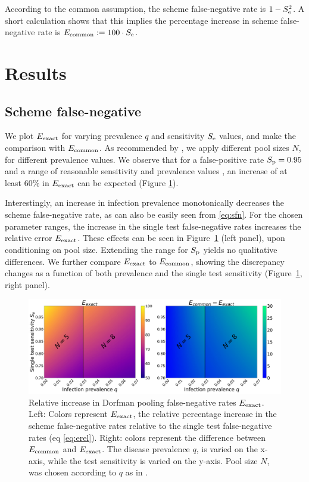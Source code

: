 \documentclass{article}
\begin{document}
According to the common assumption, the scheme false-negative rate is
$1-S_\text{e}^2$. A short calculation shows that this implies the percentage
increase in scheme false-negative rate is $E_{\text{{common}}} := 100\cdot
S_\text{e}$.

\section*{Results}\label{section:results}
\subsection*{Scheme false-negative}
We plot $E_{\text{{exact}}}$ for varying prevalence $q$ and sensitivity $S_\text{e}$
values, and make the comparison with $E_{\text{{common}}}$. As recommended by
\cite{DorfmanYuvalDor}, we apply different pool sizes $N$, for
different prevalence values. We observe that for a false-positive rate
$S_\text{p}=0.95$ \cite{DorfmanYuvalDor} and a range of reasonable
sensitivity and prevalence values \cite{KitComparison,
  InterpretingCOVID19Test, EstimatingRatesLourenco,
  FalsePositiveEstimate}, an increase of at least $60\%$ in
$E_{\text{{exact}}}$ can be expected (Figure \ref{fig1}).

Interestingly, an increase in infection prevalence monotonically
decreases the scheme false-negative rate, as can also be easily seen
from \eqref{eq:sfn}. For the chosen parameter ranges, the increase in
the single test false-negative rates increases the relative error
$E_{\text{{exact}}}$. These effects can be seen in Figure~\ref{fig1} (left
panel), upon conditioning on pool size. Extending the range for $S_\text{p}$
yields no qualitative differences. We further compare $E_{\text{{exact}}}$ to
$E_{\text{{common}}}$, showing the discrepancy changes as a function of both
prevalence and the single test sensitivity (Figure~\ref{fig1}, right
panel).
\begin{figure}[H]
  \centering
  \includegraphics[width=\textwidth]{heatmap_sfn.jpg}
  \caption{Relative increase in Dorfman pooling false-negative rates
    $E_{\text{{exact}}}$. Left: Colors represent $E_{\text{{exact}}}$, the relative
    percentage increase in the scheme false-negative rates relative
    to the single test false-negative rates (eq
    \eqref{eq:erel}). Right: colors represent the difference between
    $E_{\text{{common}}}$ and $E_{\text{{exact}}}$. The disease prevalence $q$, is
    varied on the x-axis, while the test sensitivity is varied on
    the y-axis. Pool size $N$, was chosen according to $q$ as in
    \cite{DorfmanYuvalDor}.}\label{fig1}
\end{figure}
\end{document}
